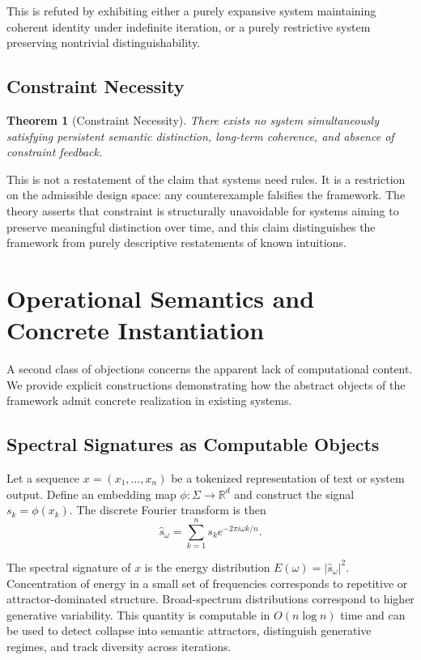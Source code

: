 \documentclass[12pt, a4paper]{article}
\theoremstyle{plain}
\newtheorem{theorem}{Theorem}[section]
\theoremstyle{definition}
\theoremstyle{remark}
\begin{document}
This is refuted by exhibiting either a purely expansive system maintaining coherent identity under indefinite iteration, or a purely restrictive system preserving nontrivial distinguishability.

\subsection{Constraint Necessity}

\begin{theorem}[Constraint Necessity]
There exists no system simultaneously satisfying persistent semantic distinction, long-term coherence, and absence of constraint feedback.
\end{theorem}

This is not a restatement of the claim that systems need rules. It is a restriction on the admissible design space: any counterexample falsifies the framework. The theory asserts that constraint is structurally unavoidable for systems aiming to preserve meaningful distinction over time, and this claim distinguishes the framework from purely descriptive restatements of known intuitions.

\section{Operational Semantics and Concrete Instantiation}

A second class of objections concerns the apparent lack of computational content. We provide explicit constructions demonstrating how the abstract objects of the framework admit concrete realization in existing systems.

\subsection{Spectral Signatures as Computable Objects}

Let a sequence $x = (x_1, \dots, x_n)$ be a tokenized representation of text or system output. Define an embedding map $\phi : \Sigma \to \mathbb{R}^d$ and construct the signal $s_k = \phi(x_k)$. The discrete Fourier transform is then
\[
\hat{s}_\omega = \sum_{k=1}^n s_k e^{-2\pi i \omega k / n}.
\]

The spectral signature of $x$ is the energy distribution $E(\omega) = |\hat{s}_\omega|^2$. Concentration of energy in a small set of frequencies corresponds to repetitive or attractor-dominated structure. Broad-spectrum distributions correspond to higher generative variability. This quantity is computable in $O(n \log n)$ time and can be used to detect collapse into semantic attractors, distinguish generative regimes, and track diversity across iterations.
\end{document}
